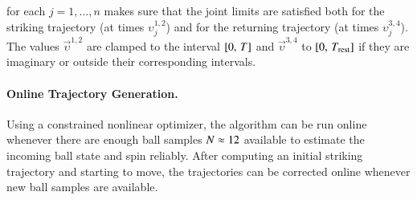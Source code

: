 %
\noindent for each $j = 1, \ldots, n$ makes sure that the joint limits are satisfied both for the striking trajectory (at times $\upsilon_{j}^{1,2}$) and for the returning trajectory (at times $\upsilon_{j}^{3,4}$). The values $\vec{\upsilon}^{1,2}$ are clamped to the interval $[0, \, T]$ and $\vec{\upsilon}^{3,4}$ to $[0, \, T_{\mathrm{rest}}]$ if they are imaginary or outside their corresponding intervals. 

\paragraph{\textbf{Online Trajectory Generation}.} Using a constrained nonlinear optimizer, the algorithm can be run online whenever there are enough ball samples $N \approx 12$ available to estimate the incoming ball state and spin reliably. After computing an initial striking trajectory and starting to move, the trajectories can be corrected online whenever new ball samples are available. 
%
